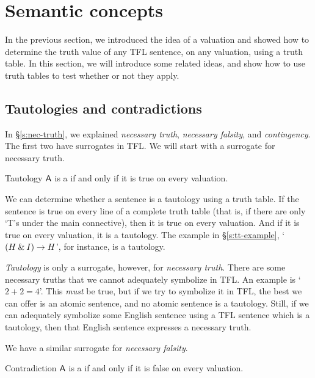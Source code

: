 

\chapter{Semantic concepts}
\label{s:SemanticConcepts}

In the previous section, we introduced the idea of a valuation and showed how to determine the truth value of any TFL sentence, on any valuation, using a truth table. In this section, we will introduce some related ideas, and show how to use truth tables to test whether or not they apply.


\section{Tautologies and contradictions}
In \S\ref{s:nec-truth}, we explained \emph{necessary truth}, \emph{necessary falsity}, and \textit{contingency}. The first two have surrogates in TFL. We will start with a surrogate for necessary truth.

\begin{factboxy}{Tautology}
$\mathsf{A}$ is a  if and only if it is true on every valuation.
\end{factboxy}

We can determine whether a sentence is a tautology using a truth table. If the sentence is true on every line of a complete truth table (that is, if there are only `T's under the main connective), then it is true on every valuation. And if it is true on every valuation, it is a tautology. The example in \S\ref{s:tt-example}, `$(H \mathbin{\&} I) \rightarrow H$', for instance, is a tautology. 

\textit{Tautology} is only a surrogate, however, for \textit{necessary truth}. There are some necessary truths that we cannot adequately symbolize in TFL. An example is `$2 + 2 = 4$'. This \emph{must} be true, but if we try to symbolize it in TFL, the best we can offer is an atomic sentence, and no atomic sentence is a tautology. Still, if we can adequately symbolize some English sentence using a TFL sentence which is a tautology, then that English sentence expresses a necessary truth.

We have a similar surrogate for \textit{necessary falsity}.
\begin{factboxy}{Contradiction}
$\mathsf{A}$ is a  if and only if it is false on every valuation.
\end{factboxy}

